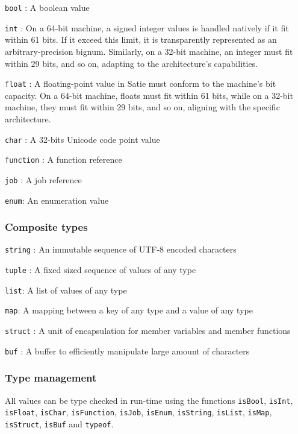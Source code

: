 \texttt{bool} : A boolean value

\texttt{int} : On a 64-bit machine, a signed integer values is handled
natively if it fit within 61 bits. If it exceed this limit, it is
transparently represented as an arbitrary-precision bignum. Similarly,
on a 32-bit machine, an integer must fit within 29 bits, and so on,
adapting to the architecture's capabilities.

\texttt{float} : A floating-point value in Satie must conform to the
machine's bit capacity. On a 64-bit machine, floats must fit within 61
bits, while on a 32-bit machine, they must fit within 29 bits, and so
on, aligning with the specific architecture.

\texttt{char} : A 32-bits Unicode code point value

\texttt{function} : A function reference

\texttt{job} : A job reference

\texttt{enum}: An enumeration value

\hypertarget{composite-types}{%
\subsubsection{Composite types}\label{composite-types}}

\texttt{string} : An immutable sequence of UTF-8 encoded characters

\texttt{tuple} : A fixed sized sequence of values of any type

\texttt{list}: A list of values of any type

\texttt{map}: A mapping between a key of any type and a value of any
type

\texttt{struct} : A unit of encapsulation for member variables and
member functions

\texttt{buf} : A buffer to efficiently manipulate large amount of
characters

\hypertarget{type-management}{%
\subsubsection{Type management}\label{type-management}}

All values can be type checked in run-time using the functions
\texttt{isBool}, \texttt{isInt}, \texttt{isFloat}, \texttt{isChar},
\texttt{isFunction}, \texttt{isJob}, \texttt{isEnum}, \texttt{isString},
\texttt{isList}, \texttt{isMap}, \texttt{isStruct}, \texttt{isBuf} and
\texttt{typeof}.

